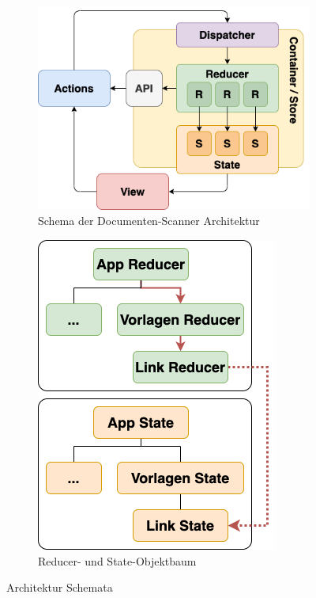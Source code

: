 \documentclass[notables, nomenclature, oneside, 150]{HSMW-Thesis}
\begin{document}
		\begin{figure}[th]
			\centering
			\begin{subfigure}[t]{0.48\textwidth}
				\centering
				\includegraphics[width=\textwidth]{img/redux.png}
				\caption{Schema der Documenten-Scanner Architektur}
				\label{fig:redux}
			\end{subfigure}
			\begin{subfigure}[t]{0.48\textwidth}
				\centering
				\includegraphics[height=0.9\textwidth]{img/tree_example.png}
				\caption{Reducer- und State-Objektbaum}
				\label{fig:tree}
			\end{subfigure}
			\caption{Architektur Schemata}
		\end{figure}
		
\end{document}
